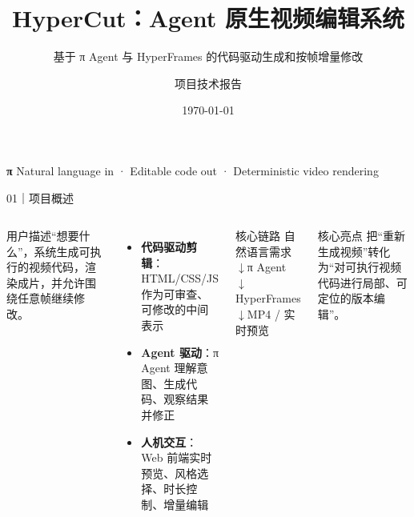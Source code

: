 \documentclass[aspectratio=169,UTF8,11pt]{ctexbeamer}
\title{HyperCut：Agent 原生视频编辑系统}
\subtitle{基于 π Agent 与 HyperFrames 的代码驱动生成和按帧增量修改}
\author{项目技术报告}
\date{\today}
\begin{document}
{
\begin{frame}[plain]
  \vspace{1.1cm}
  {\color{hclime}\Large\bfseries π}
  \vfill
  \titlepage
  \vfill
  {\color{gray}\small Natural language in · Editable code out · Deterministic video rendering}
\end{frame}}

\begin{frame}{01｜项目概述}
  \begin{columns}[T,onlytextwidth]
      \Large 用户描述“想要什么”，系统生成可执行的视频代码，渲染成片，并允许围绕任意帧继续修改。
      \vspace{0.5cm}
      \begin{itemize}
        \item \textbf{代码驱动剪辑}：HTML/CSS/JS 作为可审查、可修改的中间表示
        \item \textbf{Agent 驱动}：π Agent 理解意图、生成代码、观察结果并修正
        \item \textbf{人机交互}：Web 前端实时预览、风格选择、时长控制、增量编辑
      \end{itemize}
      \begin{block}{核心链路}
        自然语言需求
        \\[1mm]$\downarrow$\quad π Agent
        \\[1mm]$\downarrow$\quad HyperFrames
        \\[1mm]$\downarrow$\quad MP4 / 实时预览
      \end{block}
      \begin{block}{核心亮点}
        把“重新生成视频”转化为“对可执行视频代码进行局部、可定位的版本编辑”。
      \end{block}
  \end{columns}
\end{frame}
\end{document}
